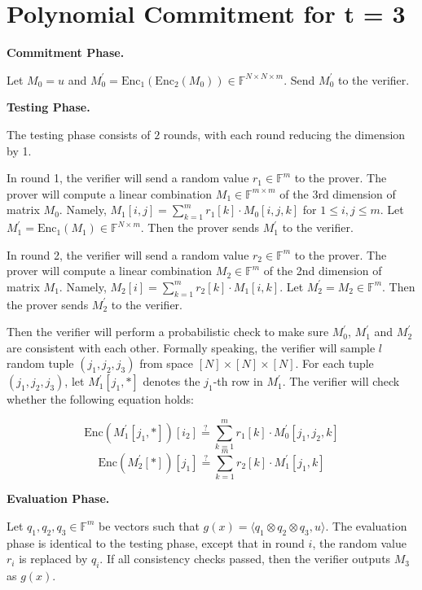 \section{Polynomial Commitment for t = 3}

\textbf{Commitment Phase.}

Let $M_0 = u$ and $M_0^{\prime} = \text{Enc}_1(\text{Enc}_2(M_0)) \in \mathbb{F}^{N \times N \times m}$. Send $M_0^{\prime}$ to the verifier.

\textbf{Testing Phase.}

The testing phase consists of $2$ rounds, with each round reducing the dimension by 1.

In round 1, the verifier will send a random value $r_1 \in \mathbb{F}^m$ to the prover.
The prover will compute a linear combination $M_1 \in \mathbb{F}^{m \times m}$ of the 3rd dimension of matrix $M_0$.
Namely, $M_1[i,j] = \sum_{k=1}^{m} r_1[k] \cdot M_0[i,j,k]$ for $1 \le i, j \le m$. 
Let $M_1^\prime = \text{Enc}_1(M_1) \in \mathbb{F}^{N \times m}$.
Then the prover sends $M_1^\prime$ to the verifier.

In round 2, the verifier will send a random value $r_2 \in \mathbb{F}^m$ to the prover.
The prover will compute a linear combination $M_2 \in \mathbb{F}^{m}$ of the 2nd dimension of matrix $M_1$.
Namely, $M_2[i] = \sum_{k=1}^{m} r_2[k] \cdot M_1[i, k]$. 
Let $M_2^\prime = M_2 \in \mathbb{F}^{m}$.
Then the prover sends $M_2^\prime$ to the verifier.

Then the verifier will perform a probabilistic check to make sure $M_0^\prime $, $ M_1^\prime$ and $M_2^\prime$ are consistent with each other. Formally speaking, the verifier will sample $l$ random tuple $(j_1, j_2, j_3)$ from space $[N] \times [N] \times [N]$. 
For each tuple $(j_1, j_2, j_3)$, let $M_1^\prime[j_1, *]$ denotes the $j_1$-th row in $M_1^\prime$.
The verifier will check whether the following equation holds:

$$
    \text{Enc}(M_1^\prime[j_1, *])[i_2] \stackrel{?}{=} \sum_{k=1}^m r_1[k] \cdot M_0^{\prime}[j_1,j_2,k]
$$
$$
    \text{Enc}(M_2^\prime[*])[j_1] \stackrel{?}{=} \sum_{k=1}^m r_2[k] \cdot M_1^{\prime}[j_1,k]
$$

\textbf{Evaluation Phase.}

Let $q_1, q_2, q_3 \in \mathbb{F}^{m}$ be vectors such that $g(x) =\langle q_1 \otimes q_2 \otimes q_3, u \rangle $. The evaluation phase is identical to the testing phase, except that in round $i$, the random value $r_i$ is replaced by $q_i$. If all consistency checks passed, then the verifier outputs $M_{3}$ as $g(x)$.

